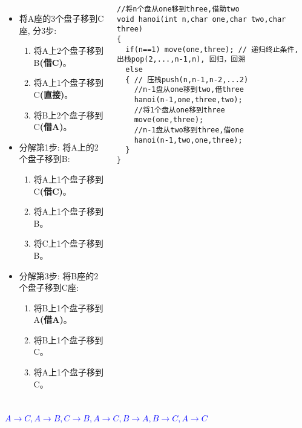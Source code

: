 \begin{frame}%
\begin{columns}[T]
	\begin{itemize}
		\small
		\item 将A座的3个盘子移到C座, 分3步:
		\begin{enumerate}
			\scriptsize
			\item 将A上2个盘子移到B\textbf{(借C)}。
			\item 将A上1个盘子移到C\textbf{(直接)}。
			\item 将B上2个盘子移到C\textbf{(借A)}。
		\end{enumerate}
		\item 分解第1步: 将A上的2个盘子移到B:
		\begin{enumerate}\scriptsize
			\item 将A上1个盘子移到C\textbf{(借C)}。
			\item 将A上1个盘子移到B。
			\item 将C上1个盘子移到B。
		\end{enumerate}
		\item 分解第3步: 将B座的2个盘子移到C座:
		\begin{enumerate}\scriptsize
			\item 将B上1个盘子移到A\textbf{(借A)}。
			\item 将B上1个盘子移到C。
			\item 将A上1个盘子移到C。
		\end{enumerate}
	\end{itemize}
\begin{lstlisting}
//将n个盘从one移到three,借助two
void hanoi(int n,char one,char two,char three)
{
  if(n==1) move(one,three); // 递归终止条件, 出栈pop(2,...,n-1,n), 回归，回溯
  else
  { // 压栈push(n,n-1,n-2,...2)
    //n-1盘从one移到two,借three
    hanoi(n-1,one,three,two); 
    //将1个盘从one移到three
    move(one,three); 
    //n-1盘从two移到three,借one
    hanoi(n-1,two,one,three);
  }
}
\end{lstlisting}
\end{columns}
\textcolor{blue}{$A\to C,A\to B,C\to B,A\to C,B\to A,B\to C,A\to C$}\\
\end{frame}

